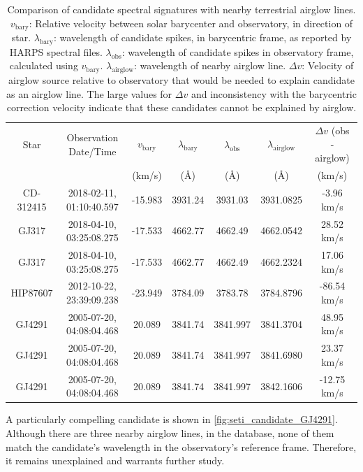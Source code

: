 \documentclass[linenumbers]{aastex631}
\begin{document}
\begin{table}
\begin{center}
    \begin{tabular}{|c|c|c|c|c|c|c|}
    \hline 
    Star & Observation Date/Time  & $v_{\mbox{bary}}$ & $\lambda_{\mbox{bary}}$ & $\lambda_{\mbox{obs}}$ & $\lambda_{\mbox{airglow}}$ & $\Delta v$ (obs - airglow) \\
    & & (km/s) & (\AA) & (\AA) & (\AA) & (km/s) \\
    \hline
    CD-312415 & 2018-02-11, 01:10:40.597 & -15.983 & 3931.24 & 3931.03 & 
    3931.0825 & -3.96 km/s \\
    GJ317 &  2018-04-10, 03:25:08.275 &  -17.533 & 4662.77 & 4662.49 & 
    4662.0542 & 28.52 km/s \\
    GJ317 &  2018-04-10, 03:25:08.275 &  -17.533 & 4662.77 & 4662.49 & 
    4662.2324 & 17.06 km/s \\
    HIP87607 & 2012-10-22, 23:39:09.238 & -23.949 & 3784.09 & 3783.78 &
    3784.8796 & -86.54 km/s \\
    GJ4291 & 2005-07-20, 04:08:04.468 & 20.089 &  3841.74 & 3841.997 &
    3841.3704 & 48.95 km/s \\
    GJ4291 & 2005-07-20, 04:08:04.468 &  20.089 &  3841.74 & 3841.997 &
    3841.6980  & 23.37 km/s \\
    GJ4291 & 2005-07-20, 04:08:04.468 &  20.089 &  3841.74 & 3841.997 &
    3842.1606  & -12.75 km/s \\
    \hline
    \end{tabular}
\end{center}    
\caption{Comparison of candidate spectral signatures with nearby terrestrial airglow lines.  $v_{\mbox{bary}}$:  Relative velocity between solar barycenter and observatory, in direction of star.  $\lambda_{\mbox{bary}}$: wavelength of candidate spikes, in barycentric frame, as reported by HARPS spectral files.  $\lambda_{\mbox{obs}}$: wavelength of candidate spikes in observatory frame, calculated using  $v_{\mbox{bary}}$. 
 $\lambda_{\mbox{airglow}}$: wavelength of nearby airglow line. $\Delta v$: Velocity of airglow source relative to observatory that would be needed to explain candidate as an airglow line.  The large values for $\Delta v$ and inconsistency with the barycentric correction velocity indicate that these candidates cannot be explained by airglow.}
\label{table:airglow_difference}
\end{table}

A particularly compelling candidate is shown in \ref{fig:seti_candidate_GJ4291}. Although there are three nearby airglow lines, in the \cite{faint_airglow_database} database, none of them match the candidate's wavelength in the observatory's reference frame. Therefore, it remains unexplained and warrants further study. 
\end{document}

